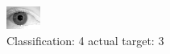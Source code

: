 \begin{figure}[h!]
\begin{center}
\includegraphics[width=0.60\columnwidth]{figures/ID2216_class_4_target_3.png}
\end{center}
\caption{ Classification: 4 actual target: 3}
\label{fig:ID2216_class_4_target_3}
\end{figure}
